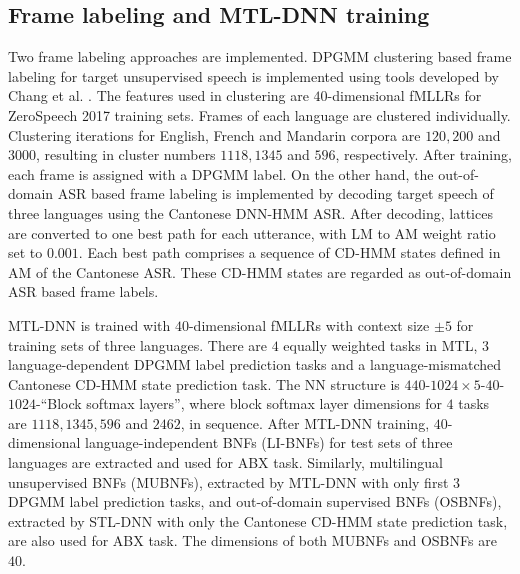 \documentclass[a4paper]{article}
\newcommand{\quotes}[1]{``#1''}
\begin{document}
\subsection{Frame labeling and MTL-DNN training}
Two frame labeling approaches are implemented. DPGMM clustering based frame labeling for target unsupervised speech is implemented using tools developed by Chang et al. \cite{chang2013parallel}. The features used in clustering are $40$-dimensional fMLLRs for ZeroSpeech 2017 training sets. Frames of each language are clustered individually. 
Clustering iterations for English, French and Mandarin corpora are $120, 200$ and $3000$, resulting in cluster numbers $1118, 1345$ and $596$, respectively. After training, each frame is assigned with a DPGMM label.
On the other hand, the out-of-domain ASR based frame labeling is implemented by decoding target speech of three languages using the Cantonese DNN-HMM ASR.
After decoding, lattices are converted to one best path for each utterance, with LM to AM weight ratio set to $0.001$. Each best path comprises a sequence of CD-HMM states defined in AM of the Cantonese ASR. These CD-HMM states are regarded as out-of-domain ASR based frame labels.

MTL-DNN is trained with $40$-dimensional fMLLRs with context size $\pm 5$ for training sets of three languages. There are $4$ equally weighted tasks in MTL, $3$ language-dependent DPGMM label prediction tasks and a language-mismatched Cantonese CD-HMM state prediction task. The NN structure is 
$440$-$1024\times 5$-$40$-$1024$-\quotes{Block softmax layers},
where block softmax layer dimensions for $4$ tasks are $1118, 1345, 596$ and $2462$, in sequence. After MTL-DNN training, $40$-dimensional language-independent BNFs (LI-BNFs) for test sets of three languages are extracted and used for ABX task. Similarly, multilingual unsupervised BNFs (MUBNFs), extracted by MTL-DNN with only first $3$ DPGMM label prediction tasks, and out-of-domain supervised BNFs (OSBNFs), extracted by STL-DNN with only the Cantonese CD-HMM state prediction task, are also used for ABX task. The dimensions of both MUBNFs and OSBNFs are $40$.
\end{document}
